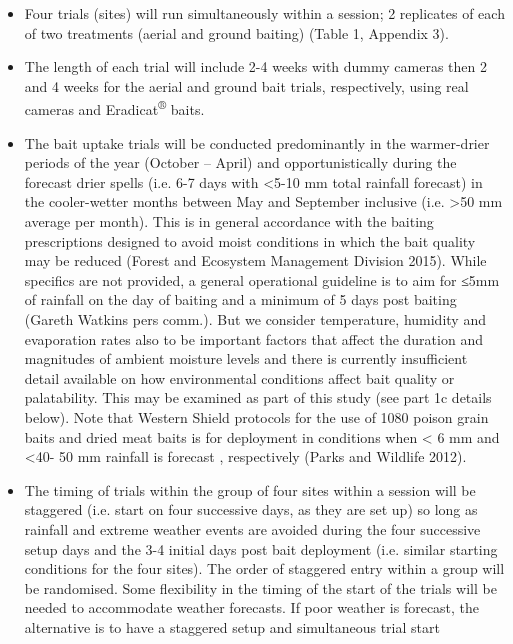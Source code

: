 \documentclass[version=last,
    paper=a4,                               %
    10pt,                                   %
    dvipsnames,
    oneside,                              %
    headings=openany,                       %
    open=any,
    BCOR=7mm,                               %
    DIV=15,     %
]{scrbook}
\begin{document}
\begin{itemize}
\itemsep1pt\parskip0pt
\item
  Four trials (sites) will run simultaneously within a session; 2
  replicates of each of two treatments (aerial and ground baiting)
  (Table 1, Appendix 3).
\item
  The length of each trial will include 2-4 weeks with dummy cameras
  then 2 and 4 weeks for the aerial and ground bait trials,
  respectively, using real cameras and Eradicat\textsuperscript{®}
  baits.
\item
  The bait uptake trials will be conducted predominantly in the
  warmer-drier periods of the year (October -- April) and
  opportunistically during the forecast drier spells (i.e. 6-7 days with
  \textless{}5-10 mm total rainfall forecast) in the cooler-wetter
  months between May and September inclusive (i.e. \textgreater{}50 mm
  average per month). This is in general accordance with the baiting
  prescriptions designed to avoid moist conditions in which the bait
  quality may be reduced (Forest and Ecosystem Management Division
  2015). While specifics are not provided, a general operational
  guideline is to aim for ≤5mm of rainfall on the day of baiting and a
  minimum of 5 days post baiting (Gareth Watkins pers comm.). But we
  consider temperature, humidity and evaporation rates also to be
  important factors that affect the duration and magnitudes of ambient
  moisture levels and there is currently insufficient detail available
  on how environmental conditions affect bait quality or palatability.
  This may be examined as part of this study (see part 1c details
  below). Note that Western Shield protocols for the use of 1080 poison
  grain baits and dried meat baits is for deployment in conditions when
  \textless{} 6 mm and \textless{}40- 50 mm rainfall is forecast ,
  respectively (Parks and Wildlife 2012).
\item
  The timing of trials within the group of four sites within a session
  will be staggered (i.e. start on four successive days, as they are set
  up) so long as rainfall and extreme weather events are avoided during
  the four successive setup days and the 3-4 initial days post bait
  deployment (i.e. similar starting conditions for the four sites). The
  order of staggered entry within a group will be randomised. Some
  flexibility in the timing of the start of the trials will be needed to
  accommodate weather forecasts. If poor weather is forecast, the
  alternative is to have a staggered setup and simultaneous trial start

\end{itemize}
\end{document}
